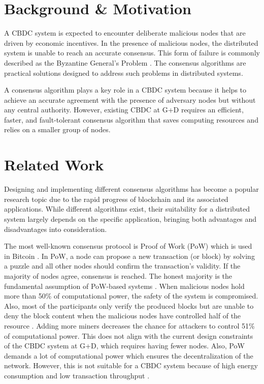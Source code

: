 \documentclass[
  english,        %
  font=times,     %
  onecolumn,      %
]{tumarticle}
\begin{document}
\section{Background \& Motivation}
\hspace{2em} A CBDC system is expected to encounter deliberate malicious nodes that are driven by economic incentives. In the presence of malicious nodes, the distributed system is unable to reach an accurate consensus. This form of failure is commonly described as the Byzantine General's Problem \cite{lamport2019byzantine}. The consensus algorithms are practical solutions designed to address such problems in distributed systems. 

\hspace{1em} A consensus algorithm plays a key role in a CBDC system because it helps to achieve an accurate agreement with the presence of adversary nodes but without any central authority. However, existing CBDC at G+D requires an efficient, faster, and fault-tolerant consensus algorithm that saves computing resources and relies on a smaller group of nodes.

\section{Related Work}
\hspace{2em} Designing and implementing different consensus algorithms has become a popular research topic due to the rapid progress of blockchain and its associated applications. While different algorithms exist, their suitability for a distributed system largely depends on the specific application, bringing both advantages and disadvantages into consideration.

\hspace{1em} The most well-known consensus protocol is Proof of Work (PoW) which is used in Bitcoin \cite{lepore2020survey}. In PoW, a node can propose a new transaction (or block) by solving a puzzle and all other nodes should confirm the transaction's validity. If the majority of nodes agree, consensus is reached. The honest majority is the fundamental assumption of PoW-based systems \cite{lepore2020survey}. When malicious nodes hold more than 50\% of computational power, the safety of the system is compromised. Also, most of the participants only verify the produced blocks but are unable to deny the block content when the malicious nodes have controlled half of the resource \cite{zhang2021hybrid}. Adding more miners decreases the chance for attackers to control 51\% of computational power. This does not align with the current design constraints of the CBDC system at G+D, which requires having fewer nodes. Also, PoW demands a lot of computational power which ensures the decentralization of the network. However, this is not suitable for a CBDC system because of high energy consumption and low transaction throughput \cite{bamakan2020survey}. 
\end{document}
